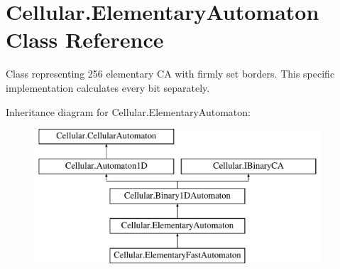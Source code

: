 \hypertarget{class_cellular_1_1_elementary_automaton}{}\section{Cellular.\+Elementary\+Automaton Class Reference}
\label{class_cellular_1_1_elementary_automaton}


Class representing 256 elementary C\+A with firmly set borders. This specific implementation calculates every bit separately.  


Inheritance diagram for Cellular.\+Elementary\+Automaton\+:\begin{figure}[H]
\begin{center}
\leavevmode
\includegraphics[height=5.000000cm]{class_cellular_1_1_elementary_automaton}
\end{center}
\end{figure}
